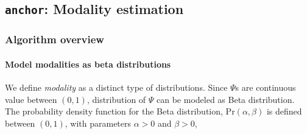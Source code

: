





\subsection{\texttt{anchor}: Modality estimation}
\label{sec:anchor}

\subsubsection{Algorithm overview}
\paragraph{Model modalities as beta distributions}

We define \emph{modality} as a distinct type of distributions. Since $\Psi$s are continuous value between $(0, 1)$, distribution of $\Psi$ can be modeled as Beta distribution. The probability density function for the Beta distribution, $\mathrm{Pr}(\alpha, \beta)$ is defined between $(0, 1)$, with parameters $\alpha > 0$ and $\beta > 0$,


